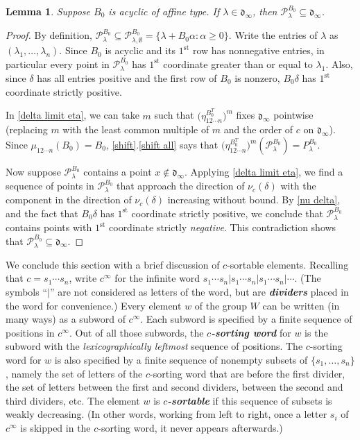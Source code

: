 \documentclass{amsart}
\newtheorem{lemma}[proposition]{Lemma}
\theoremstyle{definition}
\theoremstyle{remark}
\numberwithin{equation}{section}
\newcommand{\newword}[1]{\textbf{\emph{#1}}}
\newcommand{\set}[1]{{\lbrace #1 \rbrace}}
\newcommand{\st}{^\mathrm{st}}
\newcommand{\0}{{\mathbf{0}}}
\renewcommand{\P}{\mathcal{P}}
\renewcommand{\d}{{\mathfrak d}}
\begin{document}
\begin{lemma}\label{P in dinf}
Suppose $B_0$ is acyclic of affine type.
If $\lambda\in\d_\infty$, then $\P^{B_0}_\lambda\subseteq\d_\infty$.
\end{lemma}
\begin{proof}
By definition, $\P^{B_0}_\lambda\subseteq\P^{B_0}_{\lambda,\emptyset}=\set{\lambda+B_0\alpha:\alpha\ge0}$.
Write the entries of $\lambda$ as $(\lambda_1,\ldots,\lambda_n)$.
Since $B_0$ is acyclic and its $1\st$ row has nonnegative entries, in particular every point in $\P^{B_0}_\lambda$ has $1\st$ coordinate greater than or equal to $\lambda_1$.
Also, since $\delta$ has all entries positive and the first row of $B_0$ is nonzero, $B_0\delta$ has $1\st$ coordinate strictly positive.

In \cref{delta limit eta}, we can take $m$ such that $\bigl(\eta^{B_0^T}_{12\cdots n}\bigr)^m$ fixes $\d_\infty$ pointwise (replacing $m$ with the least common multiple of $m$ and the order of $c$ on $\d_\infty$).
Since $\mu_{12\cdots n}(B_0)=B_0$, \cref{shift}.\ref{shift all} says that $\bigl(\eta^{B_0^T}_{12\cdots n}\bigr)^m(\P_\lambda^{B_0})=P_\lambda^{B_0}$.

Now suppose $\P^{B_0}_\lambda$ contains a point $x\not\in\d_\infty$.
Applying \cref{delta limit eta}, we find a sequence of points in $\P^{B_0}_\lambda$ that approach the direction of $\nu_c(\delta)$ with the component in the direction of $\nu_c(\delta)$ increasing without bound.
By \cref{nu delta}, and the fact that $B_0\delta$ has $1\st$ coordinate strictly positive, we conclude that $\P^{B_0}_\lambda$ contains points with $1\st$ coordinate strictly \emph{negative}.
This contradiction shows that $\P^{B_0}_\lambda\subseteq\d_\infty$.
\end{proof}

We conclude this section with a brief discussion of $c$-sortable elements.  
Recalling that $c=s_1\cdots s_n$, write $c^\infty$ for the infinite word $s_1\cdots s_n|s_1\cdots s_n|s_1\cdots s_n|\cdots$.
(The symbols ``$|$'' are not considered as letters of the word, but are \newword{dividers} placed in the word for convenience.)
Every element $w$ of the group $W$ can be written (in many ways) as a subword of $c^\infty$.
Each subword is specified by a finite sequence of positions in $c^\infty$.
Out of all those subwords, the \newword{$c$-sorting word} for $w$ is the subword with the \emph{lexicographically leftmost} sequence of positions.
The $c$-sorting word for $w$ is also specified by a finite sequence of nonempty subsets of $\set{s_1,\ldots,s_n}$, namely the set of letters of the $c$-sorting word that are before the first divider, the set of letters between the first and second dividers, between the second and third dividers, etc.
The element $w$ is \newword{$c$-sortable} if this sequence of subsets is weakly decreasing.
(In other words, working from left to right, once a letter $s_i$ of $c^\infty$ is skipped in the $c$-sorting word, it never appears afterwards.)
\end{document}
